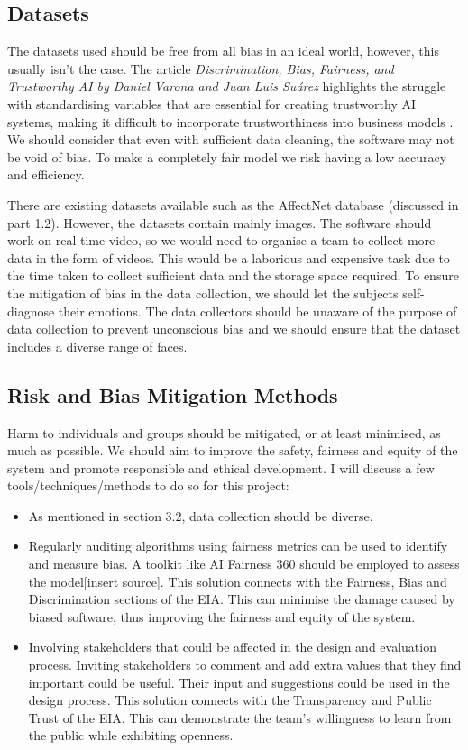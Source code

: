\documentclass[10pt,journal,compsoc]{IEEEtran}
\begin{document}
\subsection{Datasets}
The datasets used should be free from all bias in an ideal world, however, this usually isn’t the case. The article \textit{Discrimination, Bias, Fairness, and Trustworthy AI by Daniel Varona and Juan Luis Suárez} highlights the struggle with standardising variables that are essential for creating trustworthy AI systems, making it difficult to incorporate trustworthiness into business models \cite{TrustworthinessAI}. We should consider that even with sufficient data cleaning, the software may not be void of bias. To make a completely fair model we risk having a low accuracy and efficiency.

There are existing datasets available such as the AffectNet database (discussed in part 1.2). However, the datasets contain mainly images. The software should work on real-time video, so we would need to organise a team to collect more data in the form of videos. This would be a laborious and expensive task due to the time taken to collect sufficient data and the storage space required. To ensure the mitigation of bias in the data collection, we should let the subjects self-diagnose their emotions. The data collectors should be unaware of the purpose of data collection to prevent unconscious bias and we should ensure that the dataset includes a diverse range of faces.

\subsection{Risk and Bias Mitigation Methods}
Harm to individuals and groups should be mitigated, or at least minimised, as much as possible. We should aim to improve the safety, fairness and equity of the system and promote responsible and ethical development. I will discuss a few tools/techniques/methods to do so for this project:
\begin{itemize}
    \item As mentioned in section 3.2, data collection should be diverse.
    \item Regularly auditing algorithms using fairness metrics can be used to identify and measure bias. A toolkit like AI Fairness 360 should be employed to assess the model[insert source]. This solution connects with the Fairness, Bias and Discrimination sections of the EIA. This can minimise the damage caused by biased software, thus improving the fairness and equity of the system.
    \item 	Involving stakeholders that could be affected in the design and evaluation process. Inviting stakeholders to comment and add extra values that they find important could be useful\cite{Lecture9}.  Their input and suggestions could be used in the design process. This solution connects with the Transparency and Public Trust of the EIA. This can demonstrate the team’s willingness to learn from the public while exhibiting openness.
\end{itemize}
\end{document}
